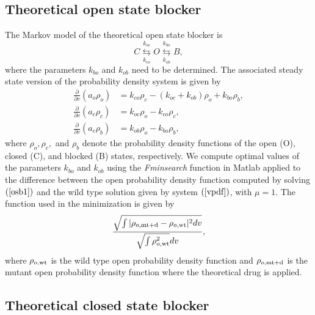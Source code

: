 \bigskip

\subsection{Theoretical open state blocker}

The Markov model of the theoretical open state blocker is%
\begin{equation}
C\underset{k_{co}}{\overset{k_{oc}}{\leftrightarrows}}O\underset{k_{ob}%
}{\overset{k_{bo}}{\leftrightarrows}}B, \label{ob1}%
\end{equation}
where the parameters $k_{bo}$ and $k_{ob}$ need to be determined. The
associated steady state version of the probability density system is given by%
\begin{align}
\frac{\partial}{\partial v}\left(  a_{o}\rho_{o}\right)   &  =k_{co}\rho
_{c}-\left(  k_{oc}+k_{ob}\right)  \rho_{o}+k_{bo}\rho_{b},\nonumber\\
\frac{\partial}{\partial v}\left(  a_{c}\rho_{c}\right)   &  =k_{oc}\rho
_{o}-k_{co}\rho_{c},\label{osb1}\\
\frac{\partial}{\partial v}\left(  a_{c}\rho_{b}\right)   &  =k_{ob}\rho
_{o}-k_{bo}\rho_{b},\nonumber
\end{align}
where $\rho_{o},\rho_{c},$ and $\rho_{b}$ denote the probability density
functions of the open (O), closed (C), and blocked (B) states, respectively. We
compute optimal values of the parameters $k_{bo}$ and $k_{ob}$ using the
{\it Fminsearch} function in Matlab applied to the difference between the open
probability density function computed by solving $\left(  \ref{osb1}\right)  $
and the wild type solution given by system $\left(  \ref{vpdf}\right)  $,
with $\mu=1.$  The function used in the minimization is given by
\[ \frac{\sqrt{\int |\rho_{o,\rm{mt+d}}-\rho_{o,\rm{wt}}|^2 dv}}{ \sqrt{\int \rho^2_{o,\rm{wt}}}dv}, \]
where $\rho_{o,\rm{wt}}$ is the wild type open probability density function and $\rho_{o,\rm{mt+d}}$
is the mutant open probability density function where the theoretical drug is applied.

\subsection{Theoretical closed state blocker}


